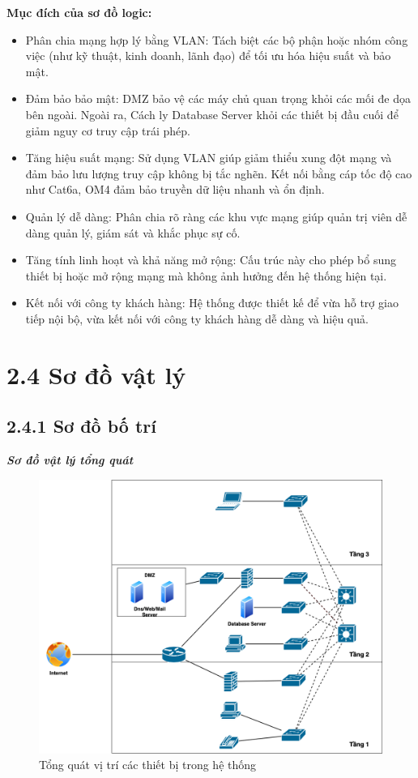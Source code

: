 \textbf{Mục đích của sơ đồ logic:}
\begin{itemize}[left=2cm]
    \item Phân chia mạng hợp lý bằng VLAN: Tách biệt các bộ phận hoặc nhóm công việc (như kỹ thuật, kinh doanh, lãnh đạo) để tối ưu hóa hiệu suất và bảo mật.
    \item Đảm bảo bảo mật: DMZ bảo vệ các máy chủ quan trọng khỏi các mối đe dọa bên ngoài. Ngoài ra, Cách ly Database Server khỏi các thiết bị đầu cuối để giảm nguy cơ truy cập trái phép.
    \item Tăng hiệu suất mạng: Sử dụng VLAN giúp giảm thiểu xung đột mạng và đảm bảo lưu lượng truy cập không bị tắc nghẽn. Kết nối bằng cáp tốc độ cao như Cat6a, OM4 đảm bảo truyền dữ liệu nhanh và ổn định.
    \item Quản lý dễ dàng: Phân chia rõ ràng các khu vực mạng giúp quản trị viên dễ dàng quản lý, giám sát và khắc phục sự cố.
    \item Tăng tính linh hoạt và khả năng mở rộng: Cấu trúc này cho phép bổ sung thiết bị hoặc mở rộng mạng mà không ảnh hưởng đến hệ thống hiện tại.
    \item Kết nối với công ty khách hàng: Hệ thống được thiết kế để vừa hỗ trợ giao tiếp nội bộ, vừa kết nối với công ty khách hàng dễ dàng và hiệu quả.
\end{itemize}
\section*{2.4 Sơ đồ vật lý}
\subsection*{2.4.1 Sơ đồ bố trí}

\textbf{\textit{Sơ đồ vật lý tổng quát}}
\begin{figure}[htbp]
    \centering
    \includegraphics[width=0.8\linewidth]{img/physicOverview.png}
    \caption{Tổng quát vị trí các thiết bị trong hệ thống}
\end{figure}
\newpage

